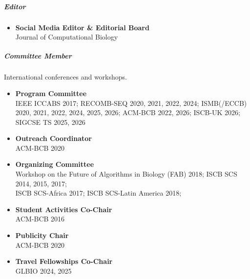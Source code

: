 \documentclass[10pt,letterpaper]{article}
\begin{document}
\subparagraph{Editor} 
\begin{itemize}%
	\item \textbf{Social Media Editor \& Editorial Board}\\
	Journal of Computational Biology
\end{itemize}

\subparagraph{Committee Member} International conferences and workshops.
\begin{itemize}%
    \item \textbf{Program Committee} \\ IEEE ICCABS 2017; RECOMB-SEQ 2020, 2021, 2022, 2024; ISMB(/ECCB) 2020, 2021, 2022, 2024, 2025, 2026; ACM-BCB 2022, 2026; ISCB-UK 2026; SIGCSE TS 2025, 2026
    \item \textbf{Outreach Coordinator} \\ ACM-BCB 2020
    \item \textbf{Organizing Committee} \\
    Workshop on the Future of Algorithms in Biology (FAB) 2018; 
    ISCB SCS 2014, 2015, 2017;  \\
    ISCB SCS\nobreakdash-Africa 2017; 
    ISCB SCS-Latin America 2018;  
    \item \textbf{Student Activities Co-Chair} \\ ACM-BCB 2016
    \item \textbf{Publicity Chair} \\ ACM-BCB 2020
    \item \textbf{Travel Fellowships Co-Chair}\\ GLBIO 2024, 2025
\end{itemize}
\end{document}
